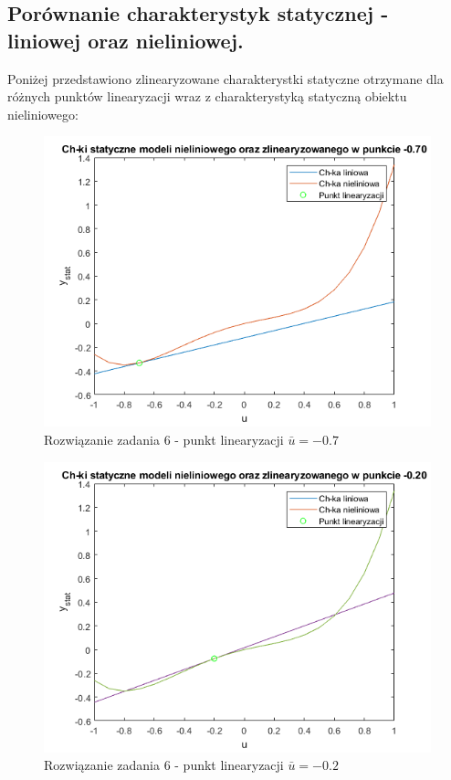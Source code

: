 \subsection{Porównanie charakterystyk statycznej - liniowej oraz nieliniowej.}
Poniżej przedstawiono zlinearyzowane charakterystki statyczne otrzymane dla różnych punktów linearyzacji wraz z charakterystyką statyczną obiektu nieliniowego:
\begin{figure}[H]
\centering
\includegraphics[width=15cm]{images/6.png}
\caption{Rozwiązanie zadania 6 - punkt linearyzacji $\bar{u}=-0.7$}
\label{fig:6}
\end{figure}
\begin{figure}[H]
\centering
\includegraphics[width=15cm]{images/7.png}
\caption{Rozwiązanie zadania 6 - punkt linearyzacji $\bar{u}=-0.2$}
\label{fig:7}
\end{figure}
